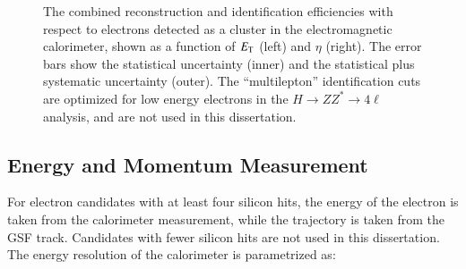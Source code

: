 \begin{figure}[htbp]
{		
	}
	\caption{The combined reconstruction and identification efficiencies with respect to electrons detected as a cluster in the electromagnetic calorimeter, shown as a function of $E_{\mathrm{T}}$ (left) and $\eta$ (right). The error bars show the statistical uncertainty (inner) and the statistical plus systematic uncertainty (outer). The ``multilepton'' identification cuts are optimized for low energy electrons in the $H\rightarrow ZZ^*\rightarrow 4\ell$ analysis, and are not used in this dissertation.}
	\label{fig:electron-id-efficiencies}
\end{figure}


\subsection{Energy and Momentum Measurement}\label{sec:reco-electron-energymomentum}
For electron candidates with at least four silicon hits, the energy of the electron is taken from the calorimeter measurement, while the trajectory is taken from the GSF track. Candidates with fewer silicon hits are not used in this dissertation. The energy resolution of the calorimeter is parametrized as:

